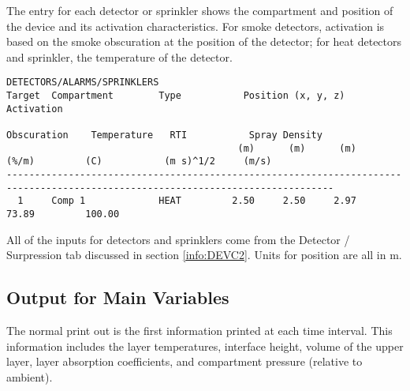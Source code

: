 The entry for each detector or sprinkler shows the compartment and position of the device and its activation characteristics. For smoke detectors, activation is based on the smoke obscuration at the position of the detector; for heat detectors and sprinkler, the temperature of the detector.


\begin{lstlisting}[basicstyle=\tiny]
DETECTORS/ALARMS/SPRINKLERS
Target  Compartment        Type           Position (x, y, z)            Activation
                                                                        Obscuration    Temperature   RTI           Spray Density
                                         (m)      (m)      (m)          (%/m)         (C)           (m s)^1/2     (m/s)
--------------------------------------------------------------------------------------------------------------------------------
  1     Comp 1             HEAT         2.50     2.50     2.97                         73.89         100.00
\end{lstlisting}

All of the inputs for detectors and sprinklers come from the Detector / Surpression tab discussed in section \ref{info:DEVC2}. Units for position are all in m.

\subsection{Output for Main Variables}

The normal print out is the first information printed at each time interval.  This information includes the layer temperatures, interface height, volume of the upper layer, layer absorption coefficients, and compartment pressure (relative to ambient).

